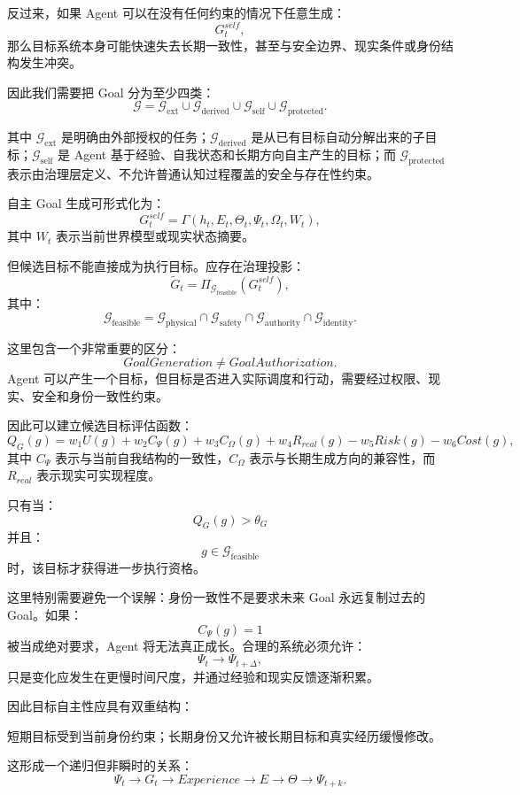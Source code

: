 反过来，如果 Agent 可以在没有任何约束的情况下任意生成：
\[
G_t^{self},
\]
那么目标系统本身可能快速失去长期一致性，甚至与安全边界、现实条件或身份结构发生冲突。

因此我们需要把 Goal 分为至少四类：
\[
\boxed{
\mathcal G
=
\mathcal G_{\mathrm{ext}}
\cup
\mathcal G_{\mathrm{derived}}
\cup
\mathcal G_{\mathrm{self}}
\cup
\mathcal G_{\mathrm{protected}}.
}
\]

其中 $\mathcal G_{\mathrm{ext}}$ 是明确由外部授权的任务；$\mathcal G_{\mathrm{derived}}$ 是从已有目标自动分解出来的子目标；$\mathcal G_{\mathrm{self}}$ 是 Agent 基于经验、自我状态和长期方向自主产生的目标；而 $\mathcal G_{\mathrm{protected}}$ 表示由治理层定义、不允许普通认知过程覆盖的安全与存在性约束。

自主 Goal 生成可形式化为：
\[
G_t^{self}
=
\Gamma(
h_t,
E_t,
\Theta_t,
\Psi_t,
\Omega_t,
W_t
),
\]
其中 $W_t$ 表示当前世界模型或现实状态摘要。

但候选目标不能直接成为执行目标。应存在治理投影：
\[
\tilde G_t
=
\Pi_{\mathcal G_{\mathrm{feasible}}}
(
G_t^{self}
),
\]
其中：
\[
\mathcal G_{\mathrm{feasible}}
=
\mathcal G_{\mathrm{physical}}
\cap
\mathcal G_{\mathrm{safety}}
\cap
\mathcal G_{\mathrm{authority}}
\cap
\mathcal G_{\mathrm{identity}}.
\]

这里包含一个非常重要的区分：
\[
\boxed{
GoalGeneration
\neq
GoalAuthorization.
}
\]
Agent 可以产生一个目标，但目标是否进入实际调度和行动，需要经过权限、现实、安全和身份一致性约束。

因此可以建立候选目标评估函数：
\[
Q_G(g)
=
w_1 U(g)
+
w_2 C_{\Psi}(g)
+
w_3 C_{\Omega}(g)
+
w_4 R_{real}(g)
-
w_5 Risk(g)
-
w_6 Cost(g),
\]
其中 $C_{\Psi}$ 表示与当前自我结构的一致性，$C_{\Omega}$ 表示与长期生成方向的兼容性，而 $R_{real}$ 表示现实可实现程度。

只有当：
\[
Q_G(g)
>
\theta_G
\]
并且：
\[
g\in
\mathcal G_{\mathrm{feasible}}
\]
时，该目标才获得进一步执行资格。

这里特别需要避免一个误解：身份一致性不是要求未来 Goal 永远复制过去的 Goal。如果：
\[
C_{\Psi}(g)=1
\]
被当成绝对要求，Agent 将无法真正成长。合理的系统必须允许：
\[
\Psi_t
\rightarrow
\Psi_{t+\Delta},
\]
只是变化应发生在更慢时间尺度，并通过经验和现实反馈逐渐积累。

因此目标自主性应具有双重结构：
\begin{statementbox}
短期目标受到当前身份约束；长期身份又允许被长期目标和真实经历缓慢修改。
\end{statementbox}
这形成一个递归但非瞬时的关系：
\[
\Psi_t
\rightarrow
G_t
\rightarrow
Experience
\rightarrow
E
\rightarrow
\Theta
\rightarrow
\Psi_{t+k}.
\]

